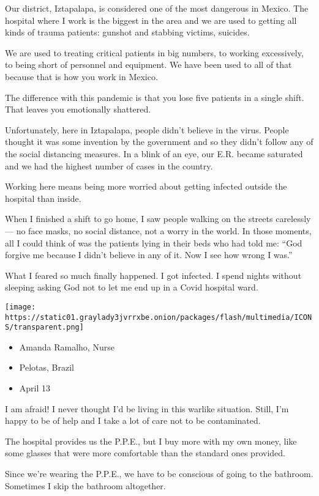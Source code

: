 Our district, Iztapalapa, is considered one of the most dangerous in
Mexico. The hospital where I work is the biggest in the area and we are
used to getting all kinds of trauma patients: gunshot and stabbing
victims, suicides.

We are used to treating critical patients in big numbers, to working
excessively, to being short of personnel and equipment. We have been
used to all of that because that is how you work in Mexico.

The difference with this pandemic is that you lose five patients in a
single shift. That leaves you emotionally shattered.

Unfortunately, here in Iztapalapa, people didn't believe in the virus.
People thought it was some invention by the government and so they
didn't follow any of the social distancing measures. In a blink of an
eye, our E.R. became saturated and we had the highest number of cases in
the country.

Working here means being more worried about getting infected outside the
hospital than inside.

When I finished a shift to go home, I saw people walking on the streets
carelessly --- no face masks, no social distance, not a worry in the
world. In those moments, all I could think of was the patients lying in
their beds who had told me: ``God forgive me because I didn't believe in
any of it. Now I see how wrong I was.''

What I feared so much finally happened. I got infected. I spend nights
without sleeping asking God not to let me end up in a Covid hospital
ward.

\texttt{[image: https://static01.graylady3jvrrxbe.onion/packages/flash/multimedia/ICONS/transparent.png]}

\begin{itemize}
\tightlist
\item
  Amanda Ramalho, Nurse
\item
  Pelotas, Brazil
\item
  April 13
\end{itemize}

I am afraid! I never thought I'd be living in this warlike situation.
Still, I'm happy to be of help and I take a lot of care not to be
contaminated.

The hospital provides us the P.P.E., but I buy more with my own money,
like some glasses that were more comfortable than the standard ones
provided.

Since we're wearing the P.P.E., we have to be conscious of going to the
bathroom. Sometimes I skip the bathroom altogether.

